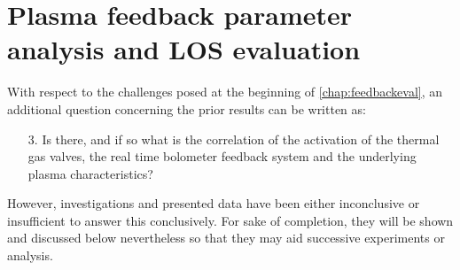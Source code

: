 \chapter{Plasma feedback parameter analysis and LOS evaluation}\label{apx:feedbackeval}%
%
    With respect to the challenges posed at the beginning of \cref{chap:feedbackeval}, an additional question concerning the prior results can be written as:%
%
    \begin{enumerate}%
        \item[3.]{%
            Is there, and if so what is the correlation of the activation of the thermal gas valves, the real time bolometer feedback system and the underlying plasma characteristics?}%
    \end{enumerate}%
%
    However, investigations and presented data have been either inconclusive or insufficient to answer this conclusively. For sake of completion, they will be shown and discussed below nevertheless so that they may aid successive experiments or analysis.%
%
